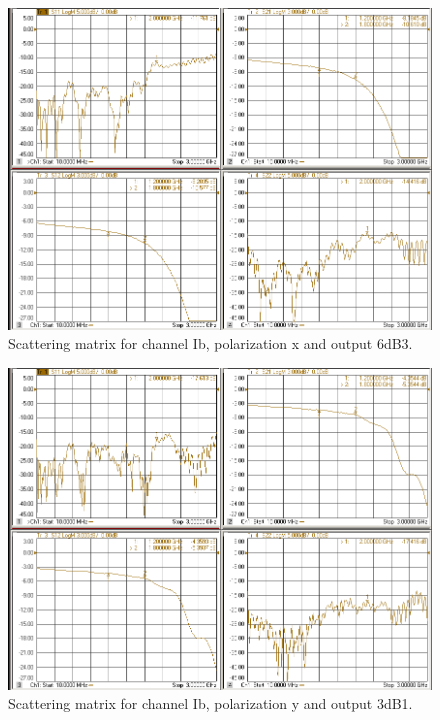 \documentclass[12pt,a4paper,oneside]{article}
\begin{document}
\begin{figure}[H]
\centering
\includegraphics[width=0.9\linewidth]{VNA_results/Ibx_6dB3.png}
\caption{Scattering matrix for channel Ib, polarization x and output 6dB3.}
\label{fig:Ibx_6dB3}
\end{figure}


\begin{figure}[H]
\centering
\includegraphics[width=0.9\linewidth]{VNA_results/Iby_3dB1.png}
\caption{Scattering matrix for channel Ib, polarization y and output 3dB1.}
\label{fig:Iby_3dB1}
\end{figure}
\end{document}
